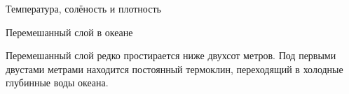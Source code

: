 \begin{chapter}{Температура, солёность и плотность}
\begin{section}{Перемешанный слой в океане}




Перемешанный слой редко простирается ниже двухсот метров. Под первыми
двустами метрами находится постоянный термоклин, переходящий в
холодные глубинные воды океана.


\end{section}
\end{chapter}

